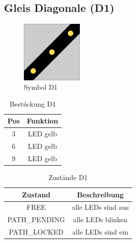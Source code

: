 \documentclass[10pt,a4paper]{article}
\begin{document}
\newpage
\subsection{Gleis Diagonale (D1)}
\begin{figure}[hbtp]
\centering
\includegraphics[width=3cm]{../folien/d1.png}
\caption{Symbol D1}
\end{figure}
\begin{table}[h!]
\centering
\begin{tabular}{c|c}
\textbf{Pos} & \textbf{Funktion} \\ \hline
3 & LED gelb \\
6 & LED gelb \\
9 & LED gelb
\end{tabular}
\caption{Bestückung D1}
\end{table}
\begin{table}[h!]
\centering
\begin{tabular}{c|c}
\textbf{Zustand} & \textbf{Beschreibung} \\ \hline
FREE & alle LEDs sind aus \\
PATH\_PENDING & alle LEDs blinken \\
PATH\_LOCKED & alle LEDs sind ein
\end{tabular}
\caption{Zustände D1}
\end{table}

\newpage
\end{document}
